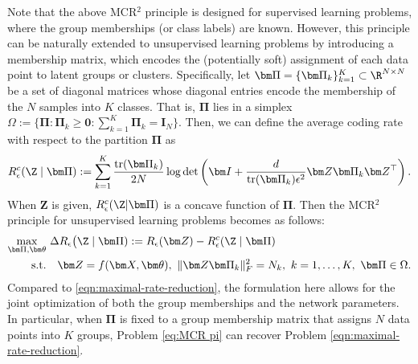 \documentclass[../../book-main.tex]{subfiles}
\begin{document}
 
    Note that the above MCR$^2$  principle is designed for supervised learning problems, where the group memberships (or class labels) are known. However, this principle can be naturally extended to unsupervised learning problems by introducing a membership matrix, which encodes the (potentially soft) assignment of each data point to latent groups or clusters. Specifically, let $\bm \Pi = \{\bm \Pi_k\}_{k=1}^K \subset \R^{N\times N}$ be a set of diagonal matrices whose diagonal entries encode the membership of the $N$ samples into $K$ classes. That is, $\bm \Pi$ lies in a simplex $\Omega := \{\bm \Pi: \bm \Pi_k \ge \bm 0: \sum_{k=1}^K \bm \Pi_k = \bm I_N\}$. Then, we can define the average coding rate with respect to the partition $\bm \Pi$ as
    \begin{align}\label{eq:MCRc}
        R_{\epsilon}^c(\Z \mid \bm \Pi) := \sum_{k=1}^K \frac{\mathrm{tr}(\bm \Pi_k)}{2N}\log\det\left(\bm I + \frac{d}{\mathrm{tr}(\bm \Pi_k)\epsilon^2}\bm Z\bm \Pi_k \bm Z^\top \right).
    \end{align}
    When $\bm Z$ is given, $R_{\epsilon}^c(\Z \vert \bm \Pi)$ is a concave function of $\bm \Pi$. Then the MCR$^2$ principle for unsupervised learning problems becomes as follows:
    \begin{align}\label{eq:MCR pi}
        \max_{\bm \Pi, \bm \theta} & \  \Delta R_{\epsilon}\big(\Z  \mid \bm \Pi) := R_{\epsilon}(\bm Z) - R_{\epsilon}^c(\Z \mid \bm \Pi) \notag \\ 
       \mathrm{s.t.}  & \ \ \ \bm Z = f(\bm X, \bm \theta),\ \|\bm Z \bm \Pi_k\|_F^2 = N_k,\ k = 1,\dots,K,\ \bm\Pi \in \Omega. 
    \end{align}
    Compared to \eqref{eqn:maximal-rate-reduction}, the formulation here allows for the joint optimization of both the group memberships and the network parameters. In particular, when $\bm \Pi$ is fixed to a group membership matrix that assigns $N$ data points into $K$ groups, Problem \eqref{eq:MCR pi} can recover Problem \eqref{eqn:maximal-rate-reduction}.
 
\end{document}
